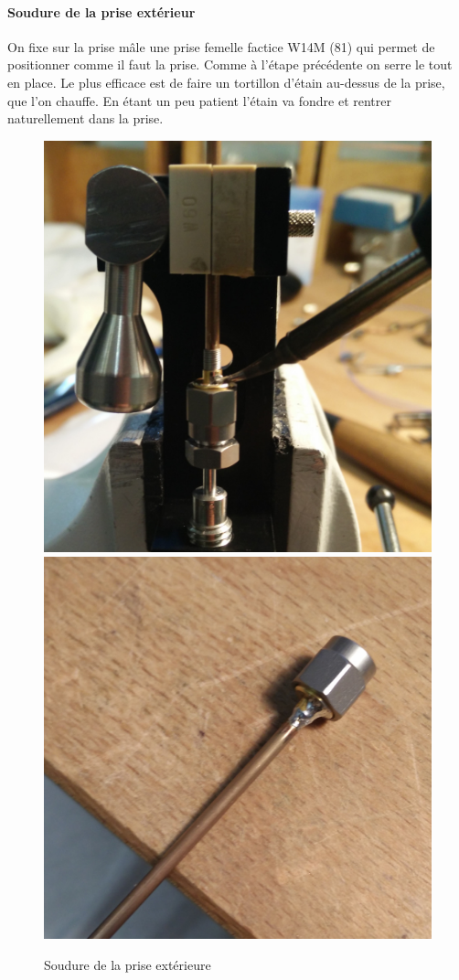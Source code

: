 \paragraph*{Soudure de la prise extérieur} On fixe sur la prise mâle une prise femelle factice W14M
(81) qui permet de positionner comme il faut la prise. Comme à l’étape précédente on
serre le tout en place.
Le plus efficace est de faire un tortillon d’étain au-dessus de la prise, que l’on chauffe. En
étant un peu patient l’étain va fondre et rentrer naturellement dans la prise.
\begin{figure}[h]
    \begin{center}
        \includegraphics[height=0.48\textwidth]{Images/Coax/4}
        \quad
        \includegraphics[height=0.48\textwidth]{Images/Coax/5}
        \caption{Soudure de la prise extérieure}
        \label{coax_soudure_exterieur}
    \end{center}
\end{figure}

